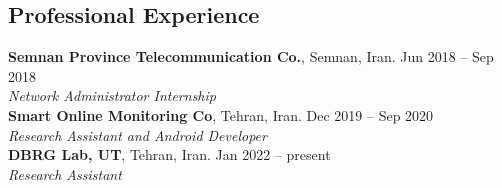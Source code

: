 \documentclass[margin,line]{res}
\begin{document}
\begin{resume}
\section{\sc Professional Experience}
{\bf Semnan Province Telecommunication Co.}, Semnan, Iran. \hfill{Jun 2018 -- Sep 2018}\\
{\em Network Administrator Internship }\\

{\bf Smart Online Monitoring Co}, Tehran, Iran. \hfill{Dec 2019 -- Sep 2020}\\
{\em Research Assistant and Android Developer  }\\

{\bf DBRG Lab, UT}, Tehran, Iran. \hfill{Jan 2022 -- present}\\
{\em Research Assistant  }\\


\end{resume}
\end{document}
